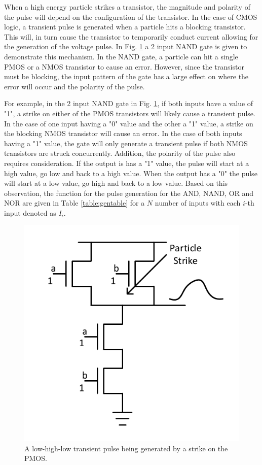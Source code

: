 When a high energy particle strikes a transistor, the magnitude and polarity of the pulse will depend on the configuration of the transistor. In the case of CMOS logic, a transient pulse is generated when a particle hits a blocking transistor. This will, in turn cause the transistor to temporarily conduct current allowing for the generation of the voltage pulse. In Fig. \ref{NANDS} a 2 input NAND gate is given to demonstrate this mechanism. In the NAND gate, a particle can hit a single PMOS or a NMOS transistor to cause an error. However, since the transistor must be blocking, the input pattern of the gate has a large effect on where the error will occur and the polarity of the pulse. 

For example, in the 2 input NAND gate in Fig. \ref{NANDS}, if both inputs have a value of "1", a strike on either of the PMOS transistors will likely cause a transient pulse. In the case of one input having a "0" value and the other a "1" value,  a strike on the blocking NMOS transistor will cause an error. In the case of both inputs having a "1" value, the gate will only generate a transient pulse if both NMOS transistors are struck concurrently. Addition, the polarity of the pulse also requires consideration. If the output is has a "1" value, the pulse will start at a high value, go low and back to a high value. When the output has a "0" the pulse will start at a low value, go high and back to a low value. Based on this observation, the function for the pulse generation for the AND, NAND, OR and NOR are given in Table \ref{table:gentable} for a $N$ number of inputs with each $i$-th input denoted as $I_i$.

\begin{figure}[!htbp]
	\centering
	\includegraphics[width=0.5\linewidth]{Figures/NAND_Strike}
	\caption{A low-high-low transient pulse being generated by a strike on the PMOS.}
	\label{NANDS}
\end{figure}

